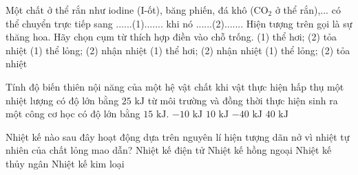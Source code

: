 \begin{ex}	Một chất ở thể rắn như iodine (I-ốt), băng phiến, đá khô ($\text{CO}_2$ ở thể rắn),... có thể chuyển trực tiếp sang ......(1)....... khi nó ......(2)....... Hiện tượng trên gọi là sự thăng hoa. Hãy chọn cụm từ thích hợp điền vào chỗ trống.
	\choice
	{(1) thể hơi; (2) tỏa nhiệt}
	{(1) thể lỏng; (2) nhận nhiệt}
	{\True (1) thể hơi; (2) nhận nhiệt}
	{(1) thể lỏng; (2) tỏa nhiệt}
\end{ex}

\begin{ex}	Tính độ biến thiên nội năng của một hệ vật chất khi vật thực hiện hấp thụ một nhiệt lượng có độ lớn bằng $25\text{ kJ}$ từ môi trường và đồng thời thực hiện sinh ra một công cơ học có độ lớn bằng $15\text{ kJ}$.
	\choice
	{$-10\text{ kJ}$}
	{\True $10\text{ kJ}$}
	{$-40\text{ kJ}$}
	{$40\text{ kJ}$}
\end{ex}

\begin{ex}	Nhiệt kế nào sau đây hoạt động dựa trên nguyên lí hiện tượng dãn nở vì nhiệt tự nhiên của chất lỏng mao dẫn?
	\choice
	{Nhiệt kế điện tử}
	{Nhiệt kế hồng ngoại}
	{\True Nhiệt kế thủy ngân}
	{Nhiệt kế kim loại}
\end{ex}

